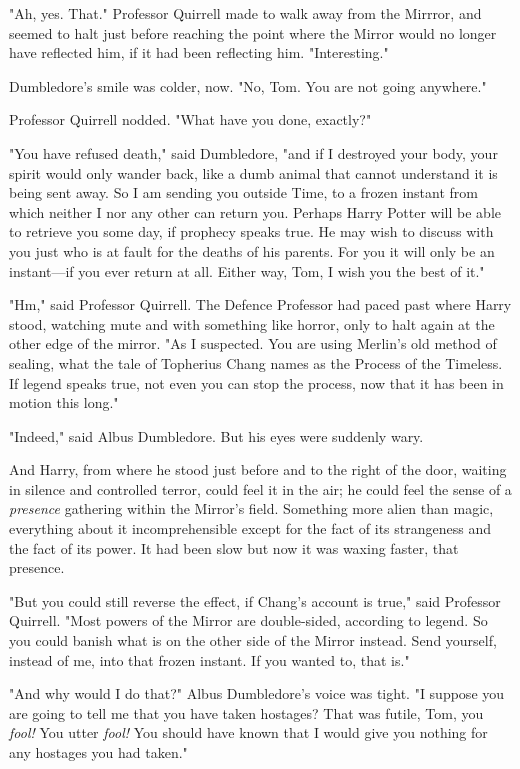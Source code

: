 "Ah, yes. That." Professor Quirrell made to walk away from the Mirrror, and
seemed to halt just before reaching the point where the Mirror would no longer
have reflected him, if it had been reflecting him. "Interesting."

Dumbledore’s smile was colder, now. "No, Tom. You are not going anywhere."

Professor Quirrell nodded. "What have you done, exactly?"

"You have refused death," said Dumbledore, "and if I destroyed your body, your
spirit would only wander back, like a dumb animal that cannot understand it is
being sent away. So I am sending you outside Time, to a frozen instant from
which neither I nor any other can return you. Perhaps Harry Potter will be able
to retrieve you some day, if prophecy speaks true. He may wish to discuss with
you just who is at fault for the deaths of his parents. For you it will only be
an instant—if you ever return at all. Either way, Tom, I wish you the best of
it."

"Hm," said Professor Quirrell. The Defence Professor had paced past where Harry
stood, watching mute and with something like horror, only to halt again at the
other edge of the mirror. "As I suspected. You are using Merlin’s old method of
sealing, what the tale of Topherius Chang names as the Process of the Timeless.
If legend speaks true, not even you can stop the process, now that it has been
in motion this long."

"Indeed," said Albus Dumbledore. But his eyes were suddenly wary.

And Harry, from where he stood just before and to the right of the door,
waiting in silence and controlled terror, could feel it in the air; he could
feel the sense of a \emph{presence} gathering within the Mirror’s field.
Something more alien than magic, everything about it incomprehensible except
for the fact of its strangeness and the fact of its power. It had been slow but
now it was waxing faster, that presence.

"But you could still reverse the effect, if Chang’s account is true," said
Professor Quirrell. "Most powers of the Mirror are double-sided, according to
legend. So you could banish what is on the other side of the Mirror instead.
Send yourself, instead of me, into that frozen instant. If you wanted to, that
is."

"And why would I do that?" Albus Dumbledore’s voice was tight. "I suppose you
are going to tell me that you have taken hostages? That was futile, Tom, you
\emph{fool!} You utter \emph{fool!} You should have known that I would give you
nothing for any hostages you had taken."

